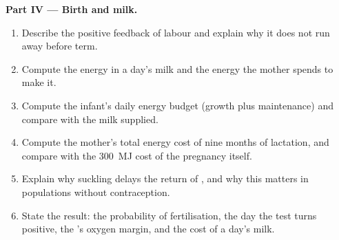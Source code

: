 \begin{problem}
\medskip
\noindent\textbf{Part IV --- Birth and milk.}
\begin{enumerate}[resume]
  \item Describe the positive feedback of labour and explain why it
        does not run away before term.
  \item Compute the energy in a day's milk and the energy the
        mother spends to make it.
  \item Compute the infant's daily energy budget (growth plus
        maintenance) and compare with the milk supplied.
  \item Compute the mother's total energy cost of nine months of
        lactation, and compare with the \qty{300}{MJ} cost of the
        pregnancy itself.
  \item Explain why suckling delays the return of , and
        why this matters in populations without contraception.
  \item State the result: the probability of fertilisation, the day
        the test turns positive, the 's oxygen margin, and
        the cost of a day's milk.
\end{enumerate}
\end{problem}
